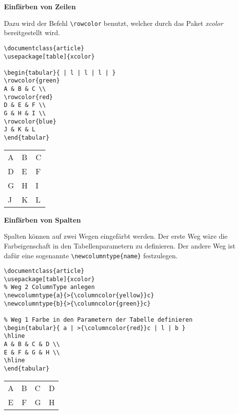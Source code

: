 \textbf{Einfärben von Zeilen}

Dazu wird der Befehl \verb|\rowcolor| benutzt, welcher durch das Paket \emph{xcolor} bereitgestellt wird.

\begin{lstlisting}[style=Latex,caption={Einfache Tabelle mit Einfärbung der Zeile},label=lst:tab6]
\documentclass{article}
\usepackage[table]{xcolor}

\begin{tabular}{ | l | l | l | }
\rowcolor{green}
A & B & C \\
\rowcolor{red}
D & E & F \\
G & H & I \\
\rowcolor{blue}
J & K & L
\end{tabular}

\end{lstlisting}


\begin{tabular}{ | l | l | l | }
	\rowcolor{green}
	A & B & C \\
	\rowcolor{red}
	D & E & F \\
	G & H & I \\
	\rowcolor{blue}
	J & K & L
\end{tabular}

\bigskip %

\textbf{Einfärben von Spalten}

Spalten können auf zwei Wegen eingefärbt werden. Der erste Weg wäre die Farbeigenschaft in den Tabellenparametern zu definieren. Der andere Weg ist dafür eine sogenannte \verb|\newcolumntype{name}| festzulegen.

\begin{lstlisting}[style=Latex,caption={Einfache Tabelle mit Einfärbung der Spalte},label=lst:tab7]
\documentclass{article}
\usepackage[table]{xcolor}
% Weg 2 ColumnType anlegen
\newcolumntype{a}{>{\columncolor{yellow}}c}
\newcolumntype{b}{>{\columncolor{green}}c}

% Weg 1 Farbe in den Parametern der Tabelle definieren
\begin{tabular}{ a | >{\columncolor{red}}c | l | b }
\hline
A & B & C & D \\
E & F & G & H \\
\hline
\end{tabular}

\end{lstlisting}
 
 
 \begin{tabular}{ a | >{}c | l | b }
 	\hline
 	A & B & C & D \\
 	E & F & G & H \\
 	\hline
 \end{tabular}

